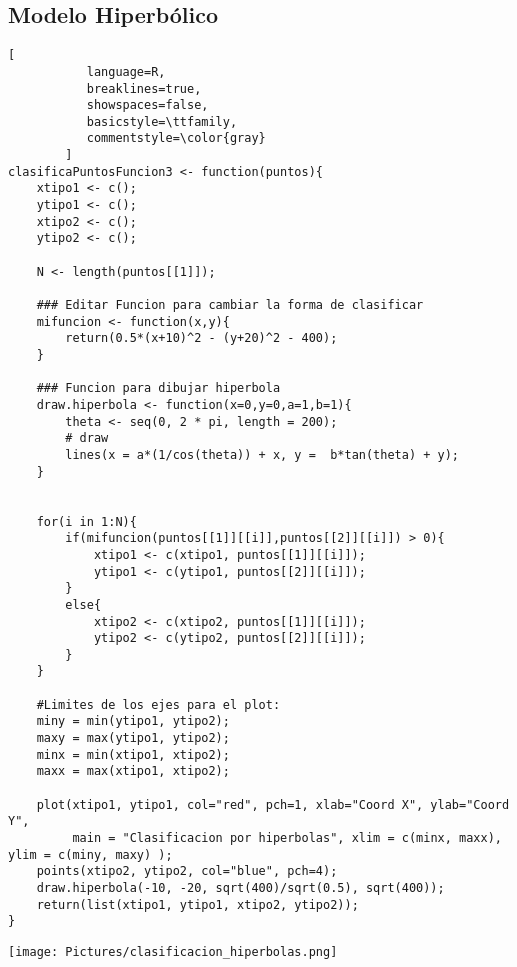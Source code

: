 \documentclass[11pt,fleqn]{book} %
\begin{document}
\subsection{Modelo Hiperbólico}
\begin{lstlisting}[
           language=R,
           breaklines=true,
           showspaces=false,
           basicstyle=\ttfamily,
           commentstyle=\color{gray}
        ]
clasificaPuntosFuncion3 <- function(puntos){
    xtipo1 <- c();
    ytipo1 <- c();
    xtipo2 <- c();
    ytipo2 <- c();
    
    N <- length(puntos[[1]]);
    
    ### Editar Funcion para cambiar la forma de clasificar
    mifuncion <- function(x,y){
        return(0.5*(x+10)^2 - (y+20)^2 - 400);
    }

    ### Funcion para dibujar hiperbola
    draw.hiperbola <- function(x=0,y=0,a=1,b=1){
        theta <- seq(0, 2 * pi, length = 200);
        # draw
        lines(x = a*(1/cos(theta)) + x, y =  b*tan(theta) + y);
    }
    
    
    for(i in 1:N){
        if(mifuncion(puntos[[1]][[i]],puntos[[2]][[i]]) > 0){
            xtipo1 <- c(xtipo1, puntos[[1]][[i]]);
            ytipo1 <- c(ytipo1, puntos[[2]][[i]]);
        }
        else{
            xtipo2 <- c(xtipo2, puntos[[1]][[i]]);
            ytipo2 <- c(ytipo2, puntos[[2]][[i]]);
        }
    }
    
    #Limites de los ejes para el plot:
    miny = min(ytipo1, ytipo2);
    maxy = max(ytipo1, ytipo2);
    minx = min(xtipo1, xtipo2);
    maxx = max(xtipo1, xtipo2);
    
    plot(xtipo1, ytipo1, col="red", pch=1, xlab="Coord X", ylab="Coord Y", 
         main = "Clasificacion por hiperbolas", xlim = c(minx, maxx), ylim = c(miny, maxy) );
    points(xtipo2, ytipo2, col="blue", pch=4);
    draw.hiperbola(-10, -20, sqrt(400)/sqrt(0.5), sqrt(400));
    return(list(xtipo1, ytipo1, xtipo2, ytipo2));
}
\end{lstlisting}

\texttt{[image: Pictures/clasificacion\_hiperbolas.png]}
\end{document}
